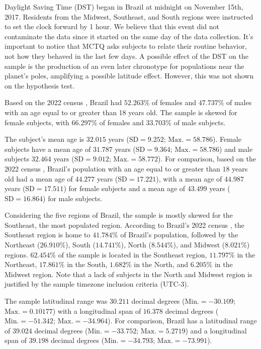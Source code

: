 \documentclass[
12pt,
openright,
oneside,
a4paper,
chapter=TITLE,
section=TITLE,
french,
spanish,
brazil,
english
]{abntex2}\usepackage{array}
\begin{document}
Daylight Saving Time (DST) began in Brazil at midnight on November 15th,
2017. Residents from the Midwest, Southeast, and South regions were
instructed to set the clock forward by 1 hour. We believe that this
event did not contaminate the data since it started on the same day of
the data collection. It's important to notice that MCTQ asks subjects to
relate their routine behavior, not how they behaved in the last few
days. A possible effect of the DST on the sample is the production of an
even later chronotype for populations near the planet's poles,
amplifying a possible latitude effect. However, this was not shown on
the hypothesis test.

Based on the 2022 census \autocite{ibgea}, Brazil had \(52.263\%\) of
females and \(47.737\%\) of males with an age equal to or greater than
18 years old. The sample is skewed for female subjects, with
\(66.297\%\) of females and \(33.703\%\) of male subjects.

The subject's mean age is \(32.015\) years (\(\text{SD} = 9.252\);
\(\text{Max.} = 58.786\)). Female subjects have a mean age of \(31.787\)
years (\(\text{SD} = 9.364\); \(\text{Max.} = 58.786\)) and male
subjects \(32.464\) years (\(\text{SD} = 9.012\);
\(\text{Max.} = 58.772\)). For comparison, based on the 2022 census
\autocite{ibgeb}, Brazil's population with an age equal to or greater
than \(18\) years old had a mean age of \(44.277\) years
(\(\text{SD} = 17.221\)), with a mean age of \(44.987\) years
(\(\text{SD} = 17.511\)) for female subjects and a mean age of
\(43.499\) years (\(\text{SD} = 16.864\)) for male subjects.

Considering the five regions of Brazil, the sample is mostly skewed for
the Southeast, the most populated region. According to Brazil's 2022
census \autocite{ibge2022}, the Southeast region is home to \(41.784\%\)
of Brazil's population, followed by the Northeast (\(26.910\%\)), South
(\(14.741\%\)), North (\(8.544\%\)), and Midwest (\(8.021\%\)) regions.
\(62.454\%\) of the sample is located in the Southeast region,
\(11.797\%\) in the Northeast, \(17.861\%\) in the South, \(1.682\%\) in
the North, and \(6.205\%\) in the Midwest region. Note that a lack of
subjects in the North and Midwest region is justified by the sample
timezone inclusion criteria (UTC-3).

The sample latitudinal range was \(30.211\) decimal degrees
(\(\text{Min.} = -30.109\); \(\text{Max.} = 0.10177\)) with a
longitudinal span of \(16.378\) decimal degrees
(\(\text{Min.} = -51.342\); \(\text{Max.} = -34.964\)). For comparison,
Brazil has a latitudinal range of \(39.024\) decimal degrees
(\(\text{Min.} = -33.752\); \(\text{Max.} = 5.2719\)) and a longitudinal
span of \(39.198\) decimal degrees (\(\text{Min.} = -34.793\);
\(\text{Max.} = -73.991\)).
\end{document}
